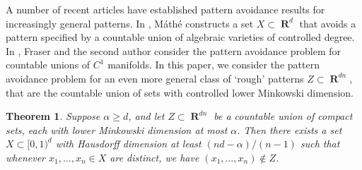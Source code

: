 \documentclass[dvipsnames,letterpaper,12pt]{article}
\numberwithin{equation}{section}
\theoremstyle{plain}
\newtheorem{theorem}{Theorem}
\theoremstyle{remark}
\DeclareMathOperator{\RR}{\mathbf{R}}
\begin{document}
A number of recent articles have established pattern avoidance results for increasingly general patterns. In \cite{Mathe}, M\'{a}th\'{e} constructs a set $X\subset\RR^d$ that avoids a pattern specified by a countable union of algebraic varieties of controlled degree. In \cite{MalabikaRob}, Fraser and the second author consider the pattern avoidance problem for countable unions of $C^1$ manifolds.
%
%
%
In this paper, we consider the pattern avoidance problem for an even more general class of `rough' patterns $Z \subset \RR^{dn}$, that are the countable union of sets with controlled lower Minkowski dimension.
%

\begin{theorem}\label{mainTheorem}
	Suppose $\alpha \geq d$, and let $Z \subset \RR^{dn}$ be a countable union of compact sets, each with lower Minkowski dimension at most $\alpha$. Then there exists a set $X \subset [0,1)^d$ with Hausdorff dimension at least $(nd - \alpha)/(n-1)$ such that whenever $x_1, \dots, x_n \in X$ are distinct, we have $(x_1, \dots, x_n) \not \in Z$.
\end{theorem}
\end{document}

